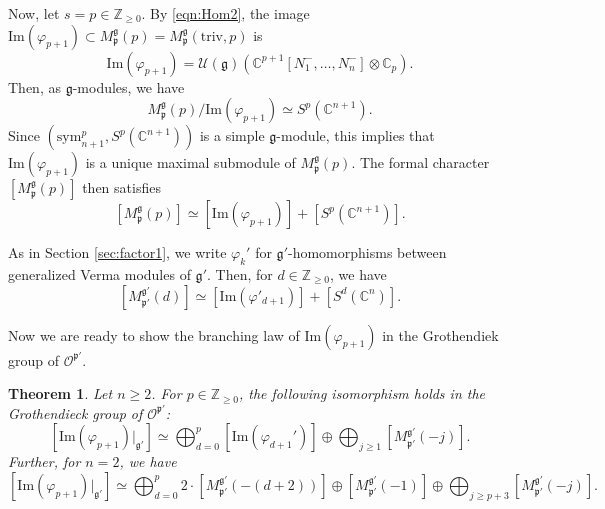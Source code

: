 \documentclass[reqno,11pt]{amsart}
\newtheorem{thm}[equation]{Theorem}
\theoremstyle{remark}
\theoremstyle{definition}
\numberwithin{equation}{section}
\newcommand{\fg}{{\mathfrak g}}
\newcommand{\fp}{{\mathfrak p}}
\newcommand{\C}{\mathbb{C}}
\newcommand{\Z}{\mathbb{Z}}
\newcommand{\Cal}{\mathcal}
\renewcommand{\Im}{\mathrm{Im}}
\newcommand{\triv}{\mathrm{triv}}
\newcommand{\sym}{\mathrm{sym}}
\newcommand{\Mp}{M^{\fg}_{\fp}}
\newcommand{\Mpp}{M^{\fg'}_{\fp'}}
\begin{document}
Now, let $s = p \in \Z_{\geq 0}$. 
By \eqref{eqn:Hom2}, the image
 $\Im(\varphi_{p+1}) \subset \Mp(p)=\Mp(\triv,p)$ 
is 
\begin{equation*}
\Im(\varphi_{p+1}) = \Cal{U}(\fg)\left(
\C^{p+1}[N_1^-,\ldots, N_n^-] \otimes \C_p
\right).
\end{equation*}
Then, as $\fg$-modules, we have 
\begin{equation*}
\Mp(p)/ \Im(\varphi_{p+1})
\simeq S^p(\C^{n+1}).
\end{equation*}
Since $(\sym^{p}_{n+1}, S^p(\C^{n+1}))$
is a simple $\fg$-module,
this implies that $\Im(\varphi_{p+1})$ 
is a unique maximal submodule of $\Mp(p)$.
The formal character $[\Mp(p)]$ then satisfies
\begin{equation}\label{eqn:GVM3d}
[\Mp(p)] \simeq [\Im(\varphi_{p+1})] + [S^p(\C^{n+1})].
\end{equation}

As in Section \ref{sec:factor1}, we write $\varphi_k'$ for
$\fg'$-homomorphisms between generalized Verma modules of $\fg'$.
Then, for $d \in \Z_{\geq 0}$, we have 
\begin{equation}\label{eqn:GVM3c}
[\Mpp(d)] \simeq [\Im(\varphi'_{d+1})] + [S^{d}(\C^{n})].
\end{equation}

Now we are ready to show the branching law of 
$\Im(\varphi_{p+1})$ in the Grothendiek group of $\Cal{O}^{\fp'}$.

\begin{thm}\label{thm:GVM2}
Let $n\geq 2$. For $p \in \Z_{\geq 0}$, 
the following isomorphism holds
in the Grothendieck group of $\Cal{O}^{\fp'}$:
\begin{equation}\label{eqn:GVM3a}
[\Im(\varphi_{p+1})\vert_{\fg'}] \simeq 
\bigoplus_{d=0}^p [\Im (\varphi_{d+1}')] \oplus \bigoplus_{j \geq 1} [\Mpp(-j)].
\end{equation}
Further, for $n=2$, we have 
\begin{equation}\label{eqn:GVM3b}
[\Im(\varphi_{p+1})\vert_{\fg'}] \simeq 
\bigoplus_{d=0}^p 2 \cdot [\Mpp(-(d+2))] \oplus [\Mpp(-1)] \oplus 
\bigoplus_{j\geq p+3} [\Mpp(-j)].
\end{equation}
\end{thm}
\end{document}

